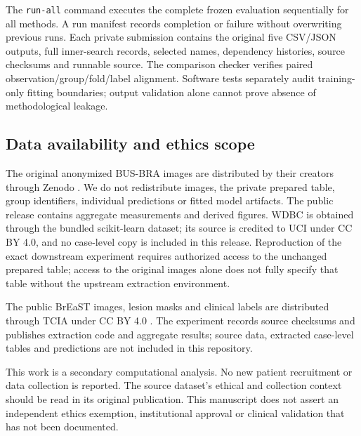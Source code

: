 \documentclass[11pt,a4paper]{article}
\begin{document}
The \texttt{run-all} command executes the complete frozen evaluation sequentially for all methods. A run manifest records completion or failure without overwriting previous runs. Each private submission contains the original five CSV/JSON outputs, full inner-search records, selected names, dependency histories, source checksums and runnable source. The comparison checker verifies paired observation/group/fold/label alignment. Software tests separately audit training-only fitting boundaries; output validation alone cannot prove absence of methodological leakage.

\subsection{Data availability and ethics scope}
The original anonymized BUS-BRA images are distributed by their creators through Zenodo \cite{zenodo}. We do not redistribute images, the private prepared table, group identifiers, individual predictions or fitted model artifacts. The public release contains aggregate measurements and derived figures. WDBC is obtained through the bundled scikit-learn dataset; its source is credited to UCI under CC BY 4.0, and no case-level copy is included in this release. Reproduction of the exact downstream experiment requires authorized access to the unchanged prepared table; access to the original images alone does not fully specify that table without the upstream extraction environment.

The public BrEaST images, lesion masks and clinical labels are distributed through TCIA under CC BY 4.0 \cite{breast}. The experiment records source checksums and publishes extraction code and aggregate results; source data, extracted case-level tables and predictions are not included in this repository.

This work is a secondary computational analysis. No new patient recruitment or data collection is reported. The source dataset's ethical and collection context should be read in its original publication. This manuscript does not assert an independent ethics exemption, institutional approval or clinical validation that has not been documented.
\end{document}
